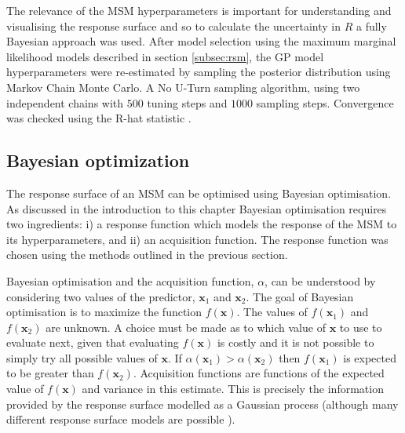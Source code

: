The relevance of the MSM hyperparameters is important for understanding and visualising the response surface and so to calculate the uncertainty in $R$ a fully Bayesian approach was used. After model selection using the maximum marginal likelihood models described in section \ref{subsec:rsm}, the GP model hyperparameters were re-estimated by sampling the posterior distribution using Markov Chain Monte Carlo. A No U-Turn sampling algorithm, using two independent chains with $500$ tuning steps and $1000$ sampling steps. Convergence was checked using the R-hat statistic \cite{vehtariRanknormalizationFoldingLocalization2020}. 

\subsection{Bayesian optimization}\label{subsec:bayes_opt}

The response surface of an MSM can be optimised using Bayesian optimisation. As discussed in the introduction to this chapter Bayesian optimisation requires two ingredients: i) a response function which models the response of the MSM to its hyperparameters, and ii) an acquisition function. The response function was chosen using the methods outlined in the previous section. 

Bayesian optimisation and the acquisition function, $\alpha$, can be understood by considering two values of the predictor, $\mathbf{x}_{1}$ and $\mathbf{x}_{2}$.  The goal of Bayesian optimisation is to maximize the function $f(\mathbf{x})$. The values of $f(\mathbf{x}_{1})$ and $f(\mathbf{x}_{2})$ are unknown. A choice must be made as to which value of $\mathbf{x}$ to use to evaluate next, given that evaluating $f(\mathbf{x})$ is costly and it is not possible to simply try all possible values of $\mathbf{x}$. If $\alpha( \mathbf{x}_{1} ) > \alpha( \mathbf{x}_{2} ) $  then $f(\mathbf{x}_{1})$ is expected to be greater than $f(\mathbf{x}_{2})$.   Acquisition functions are functions of the expected value of $f(\mathbf{x})$ and variance in this estimate. This is precisely the information provided by the response surface modelled as a Gaussian process (although many different response surface models are possible \cite{rasmussenGaussianProcessesMachine2006}).   

